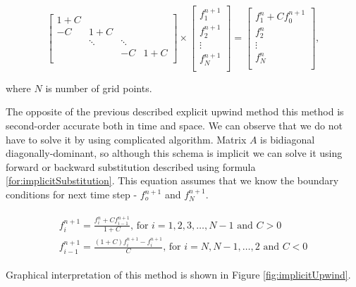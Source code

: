 			\begin{equation}
				\begin{bmatrix}
					1+C & & & \\
					-C & 1+C & & \\ 
					& \ddots & \ddots \\
					& & -C & 1+C \\					
				\end{bmatrix} 
				\times
				\begin{bmatrix}
					f_1^{n+1} \\
					f_2^{n+1} \\
					\vdots	\\
					f_N^{n+1}\\
				\end{bmatrix}
				=
				\begin{bmatrix}
					f_1^{n} + C f_0^{n+1}\\
					f_2^{n} \\
					\vdots	\\
					f_N^{n}\\
				\end{bmatrix},
			\end{equation} 
			
			where $N$ is number of grid points.
			
			The opposite of the previous described explicit upwind method this method is second-order accurate both in time and space. We can observe that we do not have to solve it by using complicated algorithm. Matrix $A$ is bidiagonal diagonally-dominant, so although this schema is implicit we can solve it using forward or backward substitution described using formula \ref{for:implicitSubstitution}. This equation assumes that we know the boundary conditions for next time step - $f_o^{n+1}$ and $f_N^{n+1}$.
			
			\begin{align}
				\label{for:implicitSubstitution}
				\begin{split}
					f_i^{n+1} = \frac{f_i^n + Cf_{i-1}^{n+1}}{1+C}\text{, for $i = 1,2,3,\ldots,N-1$ and $C>0$} \\
					f_{i-1}^{n+1} = \frac{(1+C)f_i^{n+1} - f_i^{n+1}}{C}\text{, for $i = N, N-1, \ldots, 2$ and $C < 0$}
				\end{split}
			\end{align}
			
			Graphical interpretation of this method is shown in Figure \ref{fig:implicitUpwind}.
			
